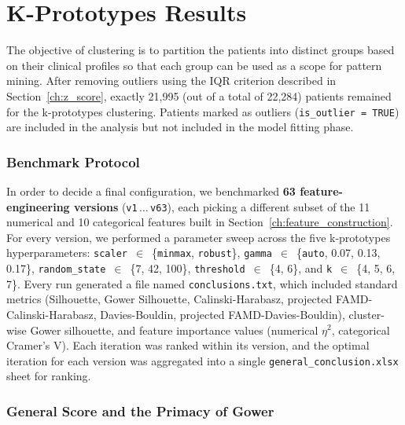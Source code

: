 \section{K-Prototypes Results}
\label{ch:results_clustering}

The objective of clustering is to partition the patients into distinct groups based on their clinical profiles so that each group can be used as a scope for pattern mining. After removing outliers using the IQR criterion described in Section~\ref{ch:z_score}, exactly 21,995 (out of a total of 22,284) patients remained for the k-prototypes clustering. Patients marked as outliers (\texttt{is\_outlier = TRUE}) are included in the analysis but not included in the model fitting phase.

\subsubsection*{Benchmark Protocol}

In order to decide a final configuration, we benchmarked \textbf{63 feature-engineering versions} (\texttt{v1}\,$\ldots$\,\texttt{v63}), each picking a different subset of the 11 numerical and 10 categorical features built in Section~\ref{ch:feature_construction}. For every version, we performed a parameter sweep across the five k-prototypes hyperparameters: \texttt{scaler}~$\in$~\{\texttt{minmax}, \texttt{robust}\}, \texttt{gamma}~$\in$~\{\texttt{auto}, 0.07, 0.13, 0.17\}, \texttt{random\_state}~$\in$~\{7, 42, 100\}, \texttt{threshold}~$\in$~\{4, 6\}, and \texttt{k}~$\in$~\{4, 5, 6, 7\}. Every run generated a file named \texttt{conclusions.txt}, which included standard metrics (Silhouette, Gower Silhouette, Calinski-Harabasz, projected FAMD-Calinski-Harabasz, Davies-Bouldin, projected FAMD-Davies-Bouldin), cluster-wise Gower silhouette, and feature importance values (numerical $\eta^2$, categorical Cramer's V). Each iteration was ranked within its version, and the optimal iteration for each version was aggregated into a single \texttt{general\_conclusion.xlsx} sheet for ranking.

\subsubsection*{General Score and the Primacy of Gower}

